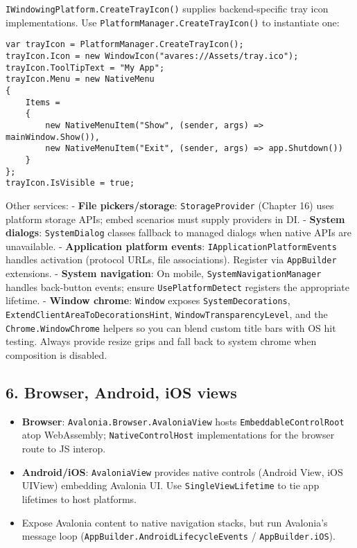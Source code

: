 \passthrough{\lstinline!IWindowingPlatform.CreateTrayIcon()!} supplies
backend-specific tray icon implementations. Use
\passthrough{\lstinline!PlatformManager.CreateTrayIcon()!} to
instantiate one:

\begin{lstlisting}
var trayIcon = PlatformManager.CreateTrayIcon();
trayIcon.Icon = new WindowIcon("avares://Assets/tray.ico");
trayIcon.ToolTipText = "My App";
trayIcon.Menu = new NativeMenu
{
    Items =
    {
        new NativeMenuItem("Show", (sender, args) => mainWindow.Show()),
        new NativeMenuItem("Exit", (sender, args) => app.Shutdown())
    }
};
trayIcon.IsVisible = true;
\end{lstlisting}

Other services: - \textbf{File pickers/storage}:
\passthrough{\lstinline!StorageProvider!} (Chapter 16) uses platform
storage APIs; embed scenarios must supply providers in DI. -
\textbf{System dialogs}: \passthrough{\lstinline!SystemDialog!} classes
fallback to managed dialogs when native APIs are unavailable. -
\textbf{Application platform events}:
\passthrough{\lstinline!IApplicationPlatformEvents!} handles activation
(protocol URLs, file associations). Register via
\passthrough{\lstinline!AppBuilder!} extensions. - \textbf{System
navigation}: On mobile,
\passthrough{\lstinline!SystemNavigationManager!} handles back-button
events; ensure \passthrough{\lstinline!UsePlatformDetect!} registers the
appropriate lifetime. - \textbf{Window chrome}:
\passthrough{\lstinline!Window!} exposes
\passthrough{\lstinline!SystemDecorations!},
\passthrough{\lstinline!ExtendClientAreaToDecorationsHint!},
\passthrough{\lstinline!WindowTransparencyLevel!}, and the
\passthrough{\lstinline!Chrome.WindowChrome!} helpers so you can blend
custom title bars with OS hit testing. Always provide resize grips and
fall back to system chrome when composition is disabled.

\subsection{6. Browser, Android, iOS
views}\label{browser-android-ios-views}

\begin{itemize}
\tightlist
\item
  \textbf{Browser}:
  \passthrough{\lstinline!Avalonia.Browser.AvaloniaView!} hosts
  \passthrough{\lstinline!EmbeddableControlRoot!} atop WebAssembly;
  \passthrough{\lstinline!NativeControlHost!} implementations for the
  browser route to JS interop.
\item
  \textbf{Android/iOS}: \passthrough{\lstinline!AvaloniaView!} provides
  native controls (Android View, iOS UIView) embedding Avalonia UI. Use
  \passthrough{\lstinline!SingleViewLifetime!} to tie app lifetimes to
  host platforms.
\item
  Expose Avalonia content to native navigation stacks, but run
  Avalonia's message loop
  (\passthrough{\lstinline!AppBuilder.AndroidLifecycleEvents!} /
  \passthrough{\lstinline!AppBuilder.iOS!}).
\end{itemize}

